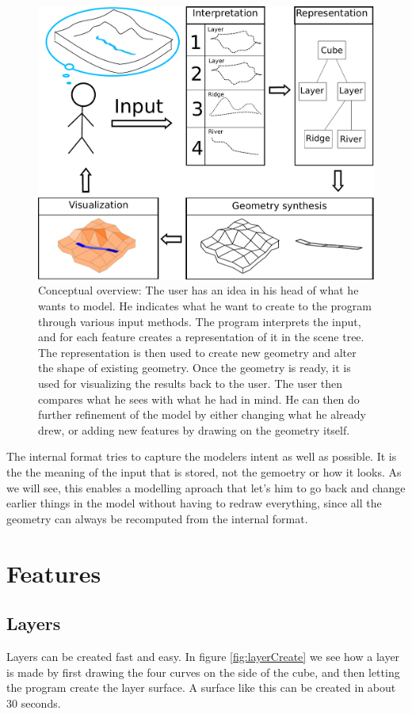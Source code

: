 \documentclass[a4paper,12pt]{report}
\begin{document}
\begin{figure}
 \includegraphics[width=\linewidth]{thesis/overviewConcept.pdf}
 \caption{Conceptual overview: The user has an idea in his head of what he wants to model. He indicates what he want to create to the program through various input methods. The program interprets the input, and for each feature creates a representation of it in the scene tree. The representation is then used to create new geometry and alter the shape of existing geometry. Once the geometry is ready, it is used for visualizing the results back to the user. The user then compares what he sees with what he had in mind. He can then do further refinement of the model by either changing what he already drew, or adding new features by drawing on the geometry itself.}
 \label{fig:overviewConcept}
\end{figure}

The internal format tries to capture the modelers intent as well as possible. It is the the meaning of the input that is stored, not the gemoetry or how it looks. As we will see, this enables a modelling aproach that let's him to go back and change earlier things in the model without having to redraw everything, since all the geometry can always be recomputed from the internal format.

\clearpage
\section{Features}
\subsection{Layers}
Layers can be created fast and easy. In figure \ref{fig:layerCreate} we see how a layer is made by first drawing the four curves on the side of the cube, and then letting the program create the layer surface. A surface like this can be created in about 30 seconds.
\end{document}
